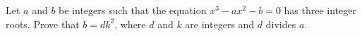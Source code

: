 Let $ a$ and $ b$ be integers such that the equation $ x^3-ax^2-b=0$ has three integer roots. Prove that $ b=dk^2$,  where $ d$ and $ k$ are integers and $ d$ divides $ a$.